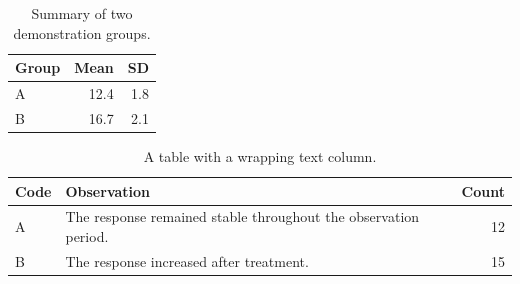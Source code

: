 \documentclass{article}
\begin{document}
\begin{table}[htbp]
  \centering
  \caption{Summary of two demonstration groups.}
  \label{tab:summary}
  \begin{tabular}{lrr}
    \toprule
    Group & Mean & SD \\
    \midrule
    A & 12.4 & 1.8 \\
    B & 16.7 & 2.1 \\
    \bottomrule
  \end{tabular}
\end{table}

\begin{table}[htbp]
  \centering
  \caption{A table with a wrapping text column.}
  \begin{tabularx}{\linewidth}{@{}lXr@{}}
    \toprule
    Code & Observation & Count \\
    \midrule
    A & The response remained stable throughout the observation period. & 12 \\
    B & The response increased after treatment. & 15 \\
    \bottomrule
  \end{tabularx}
\end{table}
\end{document}
